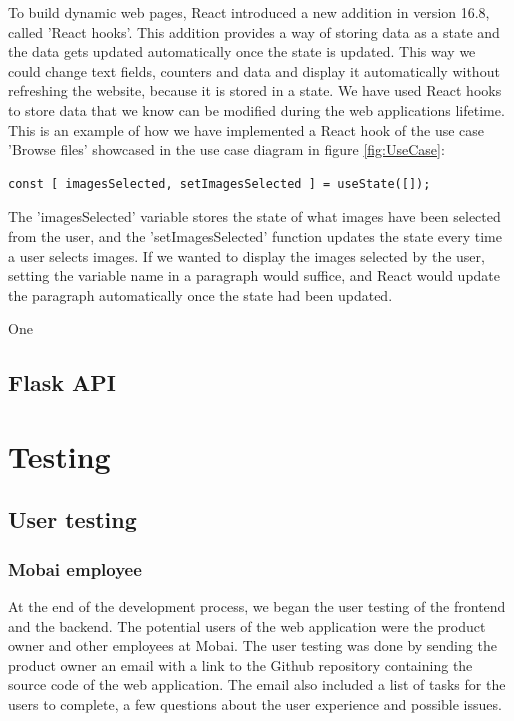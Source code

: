 To build dynamic web pages, React introduced a new addition in version 16.8, called 'React hooks'. This addition provides a way of storing data as a state and the data gets updated automatically once the state is updated. This way we could change text fields, counters and data and display it automatically without refreshing the website, because it is stored in a state. We have used React hooks to store data that we know can be modified during the web applications lifetime. This is an example of how we have implemented a React hook of the use case 'Browse files' showcased in the use case diagram in figure \ref{fig:UseCase}:
\begin{lstlisting}[language=HTML5, caption=React hook implementation]
const [ imagesSelected, setImagesSelected ] = useState([]);
\end{lstlisting}
%
The 'imagesSelected' variable stores the state of what images have been selected from the user, and the 'setImagesSelected' function updates the state every time a user selects images. If we wanted to display the images selected by the user, setting the variable name in a paragraph would suffice, and React would update the paragraph automatically once the state had been updated.

One 





\subsection{Flask API}



\section{Testing}

\subsection{User testing}

\subsubsection{Mobai employee}
At the end of the development process, we began the user testing of the frontend and the backend. The potential users of the web application were the product owner and other employees at Mobai. The user testing was done by sending the product owner an email with a link to the Github repository containing the source code of the web application. The email also included a list of tasks for the users to complete, a few questions about the user experience and possible issues.

